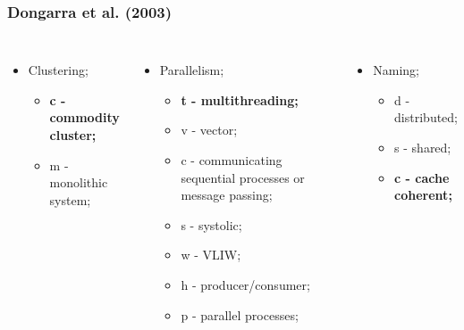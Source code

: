 \documentclass{beamer}
\begin{document}
\begin{frame}
  \frametitle{Dongarra et al. (2003)}

  \begin{columns}
    \begin{itemize}
      \item Clustering;
            \begin{itemize}
              \item \textbf{c - commodity cluster;}
              \item m - monolithic system;
            \end{itemize}
    \end{itemize}

    \begin{itemize}
      \item Parallelism;
            \begin{itemize}
              \item \textbf{t - multithreading;}
              \item v - vector;
              \item c - communicating sequential processes or message passing;
              \item s - systolic;
              \item w - VLIW;
              \item h - producer/consumer;
              \item p - parallel processes;
            \end{itemize}
    \end{itemize}

    \begin{itemize}
      \item Naming;
            \begin{itemize}
              \item d - distributed;
              \item s - shared;
              \item \textbf{c - cache coherent;}
            \end{itemize}
    \end{itemize}


\end{columns}
\end{frame}
\end{document}
